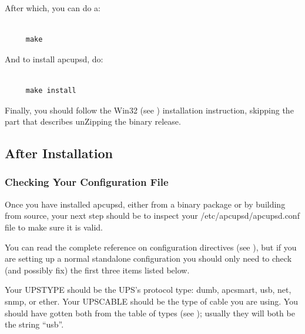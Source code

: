 After which, you can do a: 

\footnotesize
\begin{verbatim}
     
     make
\end{verbatim}
\normalsize

And to install apcupsd, do: 

\footnotesize
\begin{verbatim}
     
     make install
\end{verbatim}
\normalsize

Finally, you should follow the Win32 (see 
)
installation instruction, skipping the part that describes unZipping the
binary release. 

\label{After-Installation}

\subsection*{After Installation}

\label{index-After-Installation-57}
\label{index-Installation_002c-After-installing-58}

\label{Checking-Your-Configuration-File}

\subsubsection*{Checking Your Configuration File}

\label{index-Checking-Conf-file-59}
Once you have installed apcupsd, either from a binary package or by building
from source, your next step should be to inspect your
/etc/apcupsd/apcupsd.conf file to make sure it is valid.  

You can read the complete reference on configuration directives (see 
), but if you are
setting up a normal standalone configuration you should only need to check
(and possibly fix) the first three items listed below.  

Your UPSTYPE should be the UPS's protocol type: dumb, apcsmart, usb, net,
snmp, or ether.  Your UPSCABLE should be the type of cable you are using.  You
should have gotten both from the table of types (see 
); usually they will both be the
string ``usb''.  

